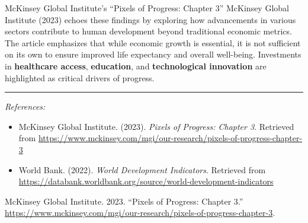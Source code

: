 \documentclass[
]{article}
\newlength{\cslhangindent}
\newenvironment{CSLReferences}[2] %
 {\begin{list}{}{%
  \setlength{\itemindent}{0pt}
  \setlength{\leftmargin}{0pt}
  \setlength{\parsep}{0pt}
  \ifodd #1
   \setlength{\leftmargin}{\cslhangindent}
   \setlength{\itemindent}{-1\cslhangindent}
  \fi
  \setlength{\itemsep}{#2\baselineskip}}}
 {\end{list}}
\begin{document}
McKinsey Global Institute's ``Pixels of Progress: Chapter 3'' McKinsey
Global Institute (2023) echoes these findings by exploring how
advancements in various sectors contribute to human development beyond
traditional economic metrics. The article emphasizes that while economic
growth is essential, it is not sufficient on its own to ensure improved
life expectancy and overall well-being. Investments in
\textbf{healthcare access}, \textbf{education}, and
\textbf{technological innovation} are highlighted as critical drivers of
progress.

\begin{center}\rule{0.5\linewidth}{0.5pt}\end{center}

\emph{References:}

\begin{itemize}
\item
  McKinsey Global Institute. (2023). \emph{Pixels of Progress: Chapter
  3}. Retrieved from
  \url{https://www.mckinsey.com/mgi/our-research/pixels-of-progress-chapter-3}
\item
  World Bank. (2022). \emph{World Development Indicators}. Retrieved
  from
  \url{https://databank.worldbank.org/source/world-development-indicators}
\end{itemize}

\label{refs}
\begin{CSLReferences}{1}{0}
McKinsey Global Institute. 2023. {``Pixels of Progress: Chapter 3.''}
\url{https://www.mckinsey.com/mgi/our-research/pixels-of-progress-chapter-3}.

\end{CSLReferences}
\end{document}
